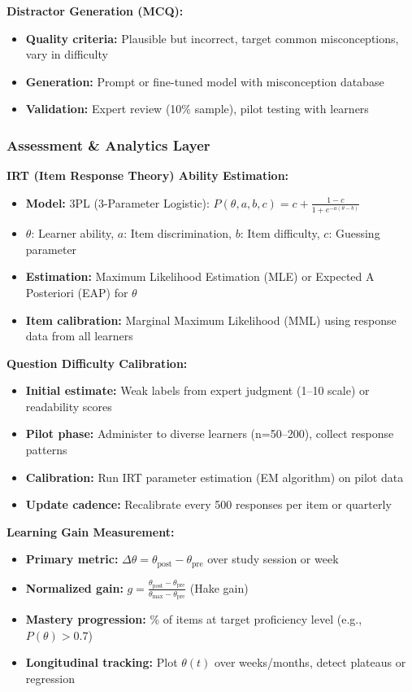 \documentclass[11pt,letterpaper]{article}
\begin{document}
\textbf{Distractor Generation (MCQ):}
\begin{itemize}
\item \textbf{Quality criteria:} Plausible but incorrect, target common misconceptions, vary in difficulty
\item \textbf{Generation:} Prompt or fine-tuned model with misconception database
\item \textbf{Validation:} Expert review (10\% sample), pilot testing with learners
\end{itemize}

\subsubsection{Assessment \& Analytics Layer}\label{subsubsec:assessment-analytics}

\textbf{IRT (Item Response Theory) Ability Estimation:}
\begin{itemize}
\item \textbf{Model:} 3PL (3-Parameter Logistic): $P(\theta, a, b, c) = c + \frac{1-c}{1 + e^{-a(\theta - b)}}$
\item $\theta$: Learner ability, $a$: Item discrimination, $b$: Item difficulty, $c$: Guessing parameter
\item \textbf{Estimation:} Maximum Likelihood Estimation (MLE) or Expected A Posteriori (EAP) for $\theta$
\item \textbf{Item calibration:} Marginal Maximum Likelihood (MML) using response data from all learners
\end{itemize}

\textbf{Question Difficulty Calibration:}
\begin{itemize}
\item \textbf{Initial estimate:} Weak labels from expert judgment (1--10 scale) or readability scores
\item \textbf{Pilot phase:} Administer to diverse learners (n=50--200), collect response patterns
\item \textbf{Calibration:} Run IRT parameter estimation (EM algorithm) on pilot data
\item \textbf{Update cadence:} Recalibrate every 500 responses per item or quarterly
\end{itemize}

\textbf{Learning Gain Measurement:}
\begin{itemize}
\item \textbf{Primary metric:} $\Delta\theta = \theta_{\text{post}} - \theta_{\text{pre}}$ over study session or week
\item \textbf{Normalized gain:} $g = \frac{\theta_{\text{post}} - \theta_{\text{pre}}}{\theta_{\text{max}} - \theta_{\text{pre}}}$ (Hake gain)
\item \textbf{Mastery progression:} \% of items at target proficiency level (e.g., $P(\theta) > 0.7$)
\item \textbf{Longitudinal tracking:} Plot $\theta(t)$ over weeks/months, detect plateaus or regression
\end{itemize}
\end{document}

